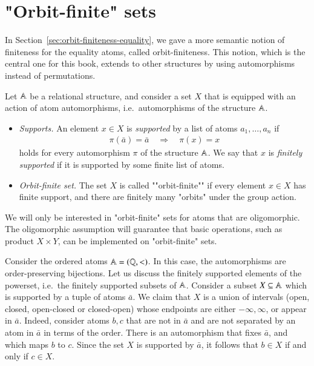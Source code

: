 \section{"Orbit-finite" sets}
\label{sec:orbit-finiteness-oligomorphic}

In Section~\ref{sec:orbit-finiteness-equality}, we gave a more semantic notion of finiteness for the equality atoms, called orbit-finiteness.  This notion, which is the central one for this book,  extends to other structures  by using automorphisms instead of permutations.  
\begin{definition}\label{def:supports-general}
	Let $\mathbb A$ be a relational structure, and consider a set $X$ that is equipped with an action of atom automorphisms, i.e.~automorphisms of the structure $\mathbb A$.
	\begin{itemize}
		\item \emph{Supports.}  An element $x \in X$ is  \emph{supported} by  a list of  atoms $a_1,\ldots,a_n$ if 
		\begin{align*}
			\pi(\bar a) = \bar a 
		\quad \Rightarrow \quad 
		\pi(x) = x
		\end{align*}
		holds for every automorphism $\pi$ of the structure $\mathbb A$. We say that $x$ is \emph{finitely supported} if it is supported by some finite list of atoms.
		\item \emph{Orbit-finite set.} 	The set $X$ is called  ""orbit-finite"" if  every element $x \in X$ has finite support, and there are finitely many "orbits" under the group action.
	\end{itemize}
\end{definition}

We will only be interested in "orbit-finite" sets for atoms that are oligomorphic. The oligomorphic assumption will guarantee that basic operations, such as product $X \times Y$, can be implemented on "orbit-finite" sets.


\begin{myexample}
	\label{example:totally-ordered-powerset}
		Consider the ordered atoms $\mathbb A = (\mathbb Q, <)$. In this case, the automorphisms are order-preserving bijections.  Let us discuss the finitely supported elements of the powerset, i.e.~the finitely supported subsets of $\mathbb A$. Consider a subset $X \subseteq \mathbb A$ which is supported by a tuple of atoms $\bar a$. We claim that $X$ is a union of intervals (open, closed, open-closed or closed-open) whose endpoints are either $-\infty, \infty$, or appear in $\bar a$. Indeed, consider atoms $b,c$ that are not in $\bar a$ and are not separated by an atom in $\bar a$ in terms of the order. There is an automorphism that fixes $\bar a$, and which maps $b$ to $c$. Since the set $X$ is supported by $\bar a$, it follows that $b \in X$ if and only if $c \in X$.
\end{myexample}



